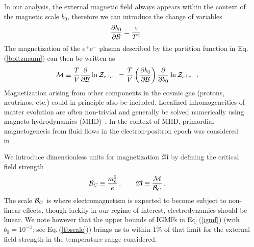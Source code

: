 \documentclass[aps,prd,floatfix,reprint]{revtex4-2}
\newcommand{\req}[1]{Eq.\,(\ref{#1})}
\begin{document}
In our analysis, the external magnetic field always appears within the context of the magnetic scale $b_{0}$, therefore we can introduce the change of variables
\begin{align}
 \frac{\partial b_{0}}{\partial{\cal B}}=\frac{e}{T^{2}}\,.
\end{align}
The magnetization of the $e^{+}e^{-}$ plasma described by the partition function in \req{boltzmann} can then be written as
\begin{align}
 \label{defmagetization}
 {\cal M}\equiv\frac{T}{V}\frac{\partial}{\partial{\cal B}}\ln{{\cal Z}_{e^{+}e^{-}}} = \frac{T}{V}\left(\frac{\partial b_{0}}{\partial{\cal B}}\right)\frac{\partial}{\partial b_{0}}\ln{{\cal Z}_{e^{+}e^{-}}}\,,
\end{align}
Magnetization arising from other components in the cosmic gas (protons, neutrinos, etc.) could in principle also be included. Localized inhomogeneities of matter evolution are often non-trivial and generally be solved numerically using magneto-hydrodynamics (MHD)~\cite{melrose2008quantum,Vazza:2017qge,Vachaspati:2020blt}. In the context of MHD, primordial magnetogenesis from fluid flows in the electron-positron epoch was considered in~\cite{Gopal:2004ut,Perrone:2021srr}.

We introduce dimensionless units for magnetization ${\mathfrak M}$ by defining the critical field strength
\begin{align}
 {\cal B}_{C}\equiv\frac{m_{e}^{2}}{e}\,,\qquad{\mathfrak M}\equiv\frac{\cal M}{{\cal B}_{C}}\,.
\end{align}
The scale ${\cal B}_{C}$ is where electromagnetism is expected to become subject to non-linear effects, though luckily in our regime of interest, electrodynamics should be linear. We note however that the upper bounds of IGMFs in \req{igmf} (with $b_{0}=10^{-3}$; see \req{tbscale}) brings us to within $1\%$ of that limit for the external field strength in the temperature range considered.
\end{document}
